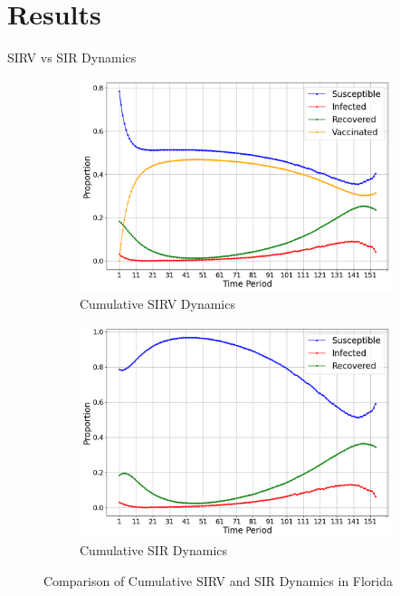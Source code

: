\documentclass[aspectratio=169,xcolor=dvipsnames]{beamer}
\begin{document}
\section{Results}
\begin{frame}{SIRV vs SIR Dynamics}
    \begin{figure}
        \centering
        \begin{subfigure}{0.43\linewidth}
            \centering
            \includegraphics[width=\linewidth]{pics/cumulSIRVDynamicsVax0.1.png}
            \caption{Cumulative SIRV Dynamics}\label{fig:sirvDynamicsVax}
        \end{subfigure}
        \hspace{2em}
        \begin{subfigure}{0.43\linewidth}
            \centering
            \includegraphics[width=\linewidth]{pics/cumulSIRVDynamicsNoVax.png}
            \caption{Cumulative SIR Dynamics}\label{fig:sirDynamicsNoVax}
        \end{subfigure}
        \caption{Comparison of Cumulative SIRV and SIR Dynamics in Florida}\label{fig:sirvDynamics}
    \end{figure}
\end{frame}
\end{document}
